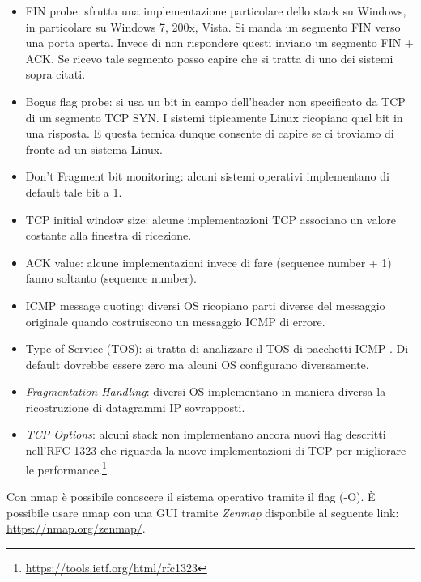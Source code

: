 \documentclass[14pt]{extreport}
\begin{document}
\begin{itemize}
    \item FIN probe: sfrutta una implementazione particolare dello stack su Windows, in particolare su Windows 7, 200x, Vista. Si manda un segmento FIN verso una porta aperta. Invece di non rispondere questi inviano un segmento FIN + ACK. Se ricevo tale segmento posso capire che si tratta di uno dei sistemi sopra citati.
    \item Bogus flag probe: si usa un bit in campo dell'header non specificato da TCP di un segmento TCP SYN. I sistemi tipicamente Linux ricopiano quel bit in una risposta. E questa tecnica dunque consente di capire se ci troviamo di fronte ad un sistema Linux.
    
    
    \item Don't Fragment bit monitoring: alcuni sistemi operativi implementano di default tale bit a 1.
    
    \item TCP initial window size: alcune implementazioni TCP associano un valore costante alla finestra di ricezione.
    
    \item ACK value: alcune implementazioni invece di fare (sequence number + 1) fanno soltanto (sequence number).
    
    \item ICMP message quoting: diversi OS ricopiano parti diverse del messaggio originale quando costruiscono un messaggio ICMP di errore.
    
    \item Type of Service (TOS): si tratta di analizzare il TOS di pacchetti ICMP . Di default dovrebbe essere zero ma alcuni OS configurano diversamente.
    
    \item \textit{Fragmentation Handling}: diversi OS implementano in maniera diversa la ricostruzione di datagrammi IP sovrapposti.
    
    \item \textit{TCP Options}: alcuni stack non implementano ancora nuovi flag descritti nell'RFC 1323 che riguarda la nuove implementazioni di TCP per migliorare le performance.\footnote{\url{https://tools.ietf.org/html/rfc1323}}.
\end{itemize}

Con nmap è possibile conoscere il sistema operativo tramite il flag (-O). È possibile usare nmap con una GUI tramite \textit{Zenmap} disponbile al seguente link: \url{https://nmap.org/zenmap/}.
\end{document}
